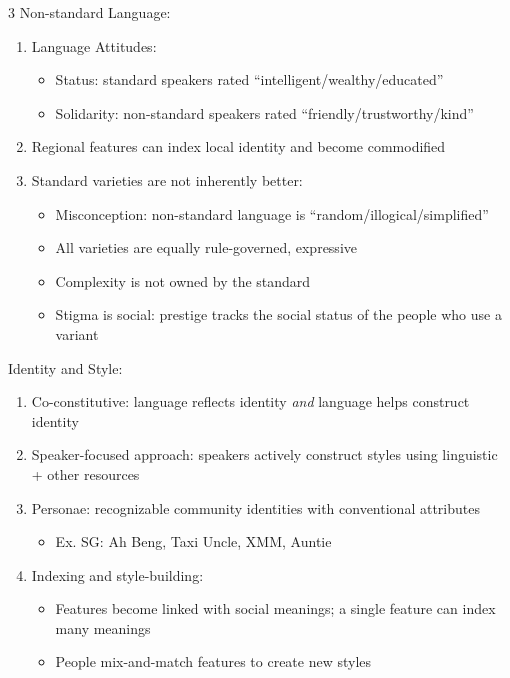 \documentclass[12pt, a4paper]{article}
\begin{document}
\begin{multicols*}{3}
Non-standard Language:
\begin{enumerate}[\roman*.]
  \item Language Attitudes:
    \begin{itemize}[leftmargin=*]\vspace{3pt}
      \item Status: standard speakers rated ``intelligent/wealthy/educated''
      \item Solidarity: non-standard speakers rated ``friendly/trustworthy/kind''
    \end{itemize}
  \item Regional features can index local identity and become commodified
  \item Standard varieties are not inherently better:
    \begin{itemize}[leftmargin=*]\vspace{3pt}
      \item Misconception: non-standard language is ``random/illogical/simplified''
      \item All varieties are equally rule-governed, expressive
      \item Complexity is not owned by the standard
      \item Stigma is social: prestige tracks the social status of the people who use a variant
    \end{itemize}
\end{enumerate}
\colbreak

Identity and Style:
\begin{enumerate}[\roman*.]
  \item Co-constitutive: language reflects identity \textit{and} language helps construct identity
  \item Speaker-focused approach: speakers actively construct styles using linguistic + other resources
  \item Personae: recognizable community identities with conventional attributes
    \begin{itemize}[leftmargin=*]\vspace{3pt}
      \item Ex. SG: Ah Beng, Taxi Uncle, XMM, Auntie
    \end{itemize}
  \item Indexing and style-building:
    \begin{itemize}[leftmargin=*]\vspace{3pt}
      \item Features become linked with social meanings; a single feature can index many meanings
      \item People mix-and-match features to create new styles
    \end{itemize}
\end{enumerate}


\end{multicols*}
\end{document}
